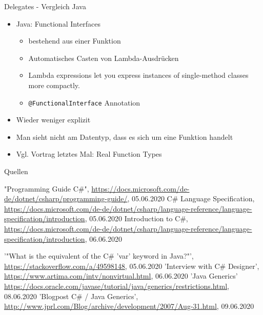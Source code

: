 \documentclass[11pt]{beamer}
\begin{document}
\begin{frame}{Delegates - Vergleich Java}
	\begin{itemize}
		\item Java: Functional Interfaces
		\begin{itemize}
			\item bestehend aus einer Funktion
			\item Automatisches Casten von Lambda-Ausdrücken
			\item \glqq Lambda expressions let you express instances of single-method classes more compactly.\grqq
			\item \texttt{@FunctionalInterface} Annotation		
		\end{itemize}
		\item Wieder weniger explizit
		\item Man sieht nicht am Datentyp, dass es sich um eine Funktion handelt
		\item Vgl. Vortrag letztes Mal: \glqq Real Function Types\grqq
	\end{itemize}
\end{frame}




\begin{frame}{Quellen}
\begin{thebibliography}{99}
\fontsize{6pt}{7.2}\selectfont
	"Programming Guide C\#", \url{https://docs.microsoft.com/de-de/dotnet/csharp/programming-guide/}, 05.06.2020
	 C\# Language Specification, \url{https://docs.microsoft.com/de-de/dotnet/csharp/language-reference/language-specification/introduction}, 05.06.2020
   Introduction to C\#, \url{https://docs.microsoft.com/de-de/dotnet/csharp/language-reference/language-specification/introduction}, 06.06.2020

 '"What is the equivalent of the C\# 'var' keyword in Java?"', 
 \url{https://stackoverflow.com/a/49598148}, 05.06.2020
 'Interview with C\# Designer', \url{https://www.artima.com/intv/nonvirtual.html}, 06.06.2020
  'Java Generics' \url{https://docs.oracle.com/javase/tutorial/java/generics/restrictions.html}, 08.06.2020
  'Blogpost C\# / Java Generics', \url{http://www.jprl.com/Blog/archive/development/2007/Aug-31.html}, 09.06.2020
\end{thebibliography}
\end{frame}
\end{document}
